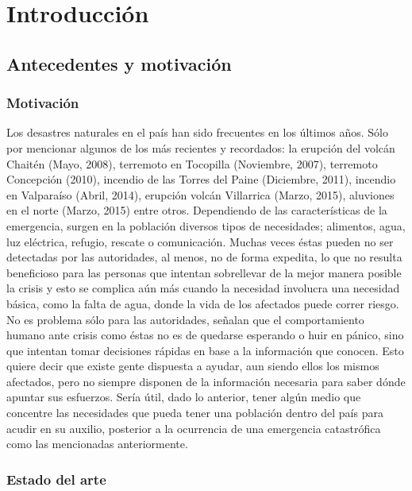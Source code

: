 \chapter{Introducción}
\label{cap:introduccion}

\section{Antecedentes y motivación}
\label{intro:motivacion}

\subsection{Motivación}
\label{intro:motivacion:motivacion}

Los desastres naturales en el país han sido frecuentes en los últimos años. Sólo por mencionar algunos de los más recientes y recordados: la erupción del volcán Chaitén (Mayo, 2008), terremoto en Tocopilla (Noviembre, 2007), terremoto Concepción (2010), incendio de las Torres del Paine (Diciembre, 2011), incendio en Valparaíso (Abril, 2014), erupción volcán Villarrica (Marzo, 2015), aluviones en el norte (Marzo, 2015) entre otros. Dependiendo de las características de la emergencia, surgen en la población diversos tipos de necesidades; alimentos, agua, luz eléctrica, refugio, rescate o comunicación. Muchas veces éstas pueden no ser detectadas por las autoridades, al menos, no de forma expedita, lo que no resulta beneficioso para las personas que intentan sobrellevar de la mejor manera posible la crisis y esto se complica aún más cuando la necesidad involucra una necesidad básica, como la falta de agua, donde la vida de los afectados puede correr riesgo. No es problema sólo para las autoridades, \cite{ChatoSurvey} señalan que el comportamiento humano ante crisis como éstas no es de quedarse esperando o huir en pánico, sino que intentan tomar decisiones rápidas en base a la información que conocen. Esto quiere decir que existe gente dispuesta a ayudar, aun siendo ellos los mismos afectados, pero no siempre disponen de la información necesaria para saber dónde apuntar sus esfuerzos. Sería útil, dado lo anterior, tener algún medio que concentre las necesidades que pueda tener una población dentro del país para acudir en su auxilio, posterior a la ocurrencia de una emergencia catastrófica como las mencionadas anteriormente.

\subsection{Estado del arte}
\label{intro:motivacion:arte}

